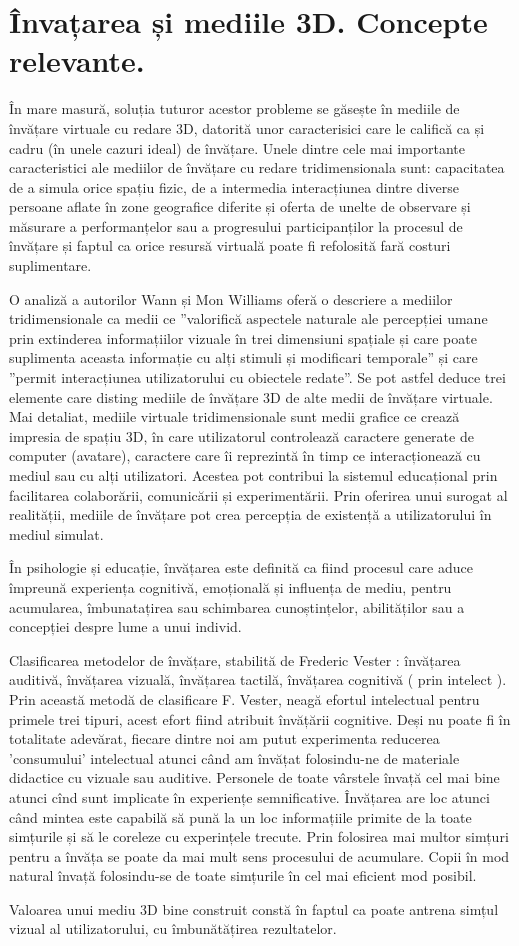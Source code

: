 \section{Învațarea și mediile 3D. Concepte relevante.}
\par În mare masură, soluția tuturor acestor probleme se găsește în mediile de învățare virtuale cu redare 3D, datorită unor caracterisici care le califică ca și cadru (în unele cazuri ideal) de învățare. Unele dintre cele mai importante caracteristici ale mediilor de învățare cu redare tridimensionala sunt: capacitatea de a simula orice spațiu fizic, de a intermedia interacțiunea dintre diverse persoane aflate în zone geografice diferite și oferta de unelte de observare și măsurare a performanțelor sau a progresului participanților la procesul de învățare și faptul ca orice resursă virtuală poate fi refolosită fară costuri suplimentare.
\par O analiză a autorilor Wann și Mon Williams oferă o descriere a mediilor tridimensionale ca medii ce ”valorifică aspectele naturale ale percepției umane prin extinderea informațiilor vizuale în trei dimensiuni spațiale și care poate suplimenta aceasta informație cu alți stimuli și modificari temporale”\cite{WANN} și care ”permit interacțiunea utilizatorului cu obiectele redate”\cite{WANN}. Se pot astfel deduce trei elemente care disting mediile de învățare 3D de alte medii de învățare virtuale. 	Mai detaliat, mediile virtuale tridimensionale sunt medii grafice ce crează impresia de spațiu 3D, în care utilizatorul controlează caractere generate de computer (avatare), caractere care îi reprezintă în timp ce interacționează cu mediul sau cu alți utilizatori. Acestea pot contribui la sistemul educațional prin facilitarea colaborării, comunicării și experimentării. Prin oferirea unui surogat al realității, mediile de învățare pot crea percepția de existență a utilizatorului în mediul simulat. 
\par În psihologie și educație, învățarea este definită ca fiind procesul care aduce împreună experiența cognitivă, emoțională și influența de mediu, pentru acumularea, îmbunatațirea sau schimbarea cunoștințelor, abilităților sau a concepției despre lume a unui individ.\cite{ILLERIS}
\par Clasificarea metodelor de învățare, stabilită de Frederic Vester\cite{VESTER} : învățarea auditivă, învățarea vizuală, învățarea tactilă, învățarea cognitivă ( prin intelect ). Prin această metodă de clasificare F. Vester, neagă efortul intelectual pentru primele trei tipuri, acest efort fiind atribuit învățării cognitive. Deși nu poate fi în totalitate adevărat, fiecare dintre noi am putut experimenta reducerea 'consumului' intelectual atunci când am învățat folosindu-ne de materiale didactice cu vizuale sau auditive. Personele de toate vârstele învață cel mai bine atunci cînd sunt implicate în experiențe semnificative. Învățarea are loc atunci când mintea este capabilă să pună la un loc informațiile primite de la toate simțurile și să le coreleze cu experințele trecute. Prin folosirea mai multor simțuri pentru a învăța se poate da mai mult sens procesului de acumulare. Copii în mod natural învață folosindu-se de toate simțurile în cel mai eficient mod posibil.
\par Valoarea unui mediu 3D bine construit constă în faptul ca poate antrena simțul vizual al utilizatorului, cu îmbunătățirea rezultatelor. 